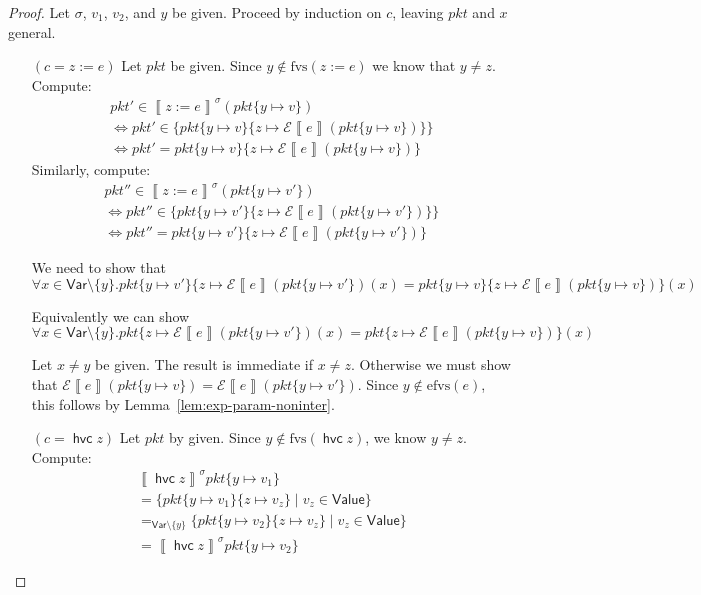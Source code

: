 \documentclass{article}
\newcommand{\pkt}{\mathit{pkt}}
\newcommand{\denote}[1]{\left\llbracket#1\right\rrbracket}
\newcommand{\edenote}[1]{\mathcal{E}\denote{#1}}
\newcommand{\Value}{\mathsf{Value}}
\newcommand{\Var}{\mathsf{Var}}
\newcommand{\havoc}[1]{\mathop{\mathsf{hvc}}#1}
\newcommand{\fvs}{\textrm{fvs}}
\newcommand{\efvs}{\textrm{efvs}}
\begin{document}
\begin{proof}
  Let $\sigma$, $v_1$, $v_2$, and $y$ be given.
  Proceed by induction on $c$, leaving $\pkt$ and $x$ general.
  \begin{enumerate}[align=left]
  \item[$(c = z := e)$]
    Let $\pkt$ be given. Since $y \not\in \fvs(z := e)$ we know that $y \neq z$.
    Compute:
    \[\begin{array}{ll}
    \pkt' \in \denote{z:=e}^\sigma (\pkt\{y \mapsto v\}) \\
    \iff \pkt' \in \{\pkt\{y \mapsto v\}\{z \mapsto \edenote{e}(\pkt\{y\mapsto v\})\}\}\\
    \iff \pkt' = \pkt\{y \mapsto v\}\{z \mapsto \edenote{e}(\pkt\{y\mapsto v\})\}
    \end{array}
    \]
    Similarly, compute:
    \[\begin{array}{ll}
    \pkt'' \in \denote{z:=e}^\sigma (\pkt\{y \mapsto v'\})\\
    \iff \pkt'' \in \{\pkt\{y \mapsto v'\}\{z \mapsto \edenote{e}(\pkt\{y\mapsto v'\})\}\}\\
    \iff \pkt'' = \pkt\{y \mapsto v'\}\{z \mapsto \edenote{e}(\pkt\{y\mapsto v'\})\}
    \end{array}
    \]

    We need to show that
    \[\forall x \in \Var \setminus \{y\}.
    \pkt\{y \mapsto v'\}\{z \mapsto \edenote{e}(\pkt\{y\mapsto v'\})(x)
    = \pkt\{y \mapsto v\}\{z \mapsto \edenote{e}(\pkt\{y\mapsto v\})\}(x)
    \]

    Equivalently we can show
    \[\forall x \in \Var \setminus \{y\}.
    \pkt\{z \mapsto \edenote{e}(\pkt\{y\mapsto v'\})(x)
    = \pkt\{z \mapsto \edenote{e}(\pkt\{y\mapsto v\})\}(x)
    \]

    Let $x \neq y$ be given. The result is immediate if $x \neq z$. Otherwise we
    must show that $\edenote{e}(\pkt\{y \mapsto v\}) = \edenote{e}(\pkt\{y
    \mapsto v'\})$. Since $y \not \in \efvs(e)$, this follows by
    Lemma~\ref{lem:exp-param-noninter}.


  \item[$(c = \havoc z)$] Let $\pkt$ by given. Since $y \not \in \fvs(\havoc z)$, we know $y \neq z$.
    Compute:
    \[\begin{array}{ll}
    \denote{\havoc z}^\sigma\pkt\{y \mapsto v_1\} \\
    = \{\pkt\{y \mapsto v_1\}\{z \mapsto v_z\} \mid v_z \in \Value\}\\
    =_{\Var \setminus \{y\}} \{\pkt\{y \mapsto v_2\}\{z \mapsto v_z\} \mid v_z \in \Value\} \\
    = \denote{\havoc z}^\sigma\pkt\{y \mapsto v_2\}
    \end{array}
    \]


\end{enumerate}
\end{proof}
\end{document}
